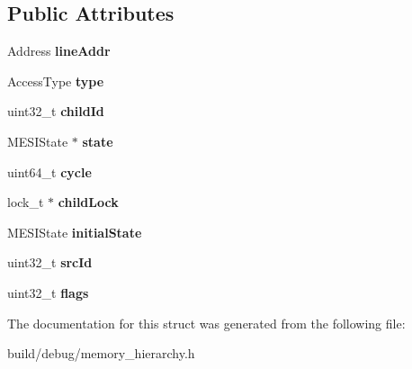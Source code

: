 \subsection*{Public Attributes}
\begin{DoxyCompactItemize}
\item 
\hypertarget{structMemReq_aff277d0b461a211c7317a5e6496797a7}{Address {\bfseries line\-Addr}}\label{structMemReq_aff277d0b461a211c7317a5e6496797a7}

\item 
\hypertarget{structMemReq_a8ad0f9d2d8e133320522e33e6456138a}{Access\-Type {\bfseries type}}\label{structMemReq_a8ad0f9d2d8e133320522e33e6456138a}

\item 
\hypertarget{structMemReq_a625f6e100f76719cb76671f9a0da5c75}{uint32\-\_\-t {\bfseries child\-Id}}\label{structMemReq_a625f6e100f76719cb76671f9a0da5c75}

\item 
\hypertarget{structMemReq_ad3e570609988405064d0e677901361c7}{M\-E\-S\-I\-State $\ast$ {\bfseries state}}\label{structMemReq_ad3e570609988405064d0e677901361c7}

\item 
\hypertarget{structMemReq_a11a5ceb04211f9e6a1584b0006ef0b53}{uint64\-\_\-t {\bfseries cycle}}\label{structMemReq_a11a5ceb04211f9e6a1584b0006ef0b53}

\item 
\hypertarget{structMemReq_ac5937ae766d938c48e66b06f6c6c4d43}{lock\-\_\-t $\ast$ {\bfseries child\-Lock}}\label{structMemReq_ac5937ae766d938c48e66b06f6c6c4d43}

\item 
\hypertarget{structMemReq_a346fbfd81deef9b3269aea15d76aa276}{M\-E\-S\-I\-State {\bfseries initial\-State}}\label{structMemReq_a346fbfd81deef9b3269aea15d76aa276}

\item 
\hypertarget{structMemReq_ab1c5db5372b47dd1e44c04e7c31e3adb}{uint32\-\_\-t {\bfseries src\-Id}}\label{structMemReq_ab1c5db5372b47dd1e44c04e7c31e3adb}

\item 
\hypertarget{structMemReq_a2f0374088b59f72c7a3e6ad78209a5e6}{uint32\-\_\-t {\bfseries flags}}\label{structMemReq_a2f0374088b59f72c7a3e6ad78209a5e6}

\end{DoxyCompactItemize}


The documentation for this struct was generated from the following file\-:\begin{DoxyCompactItemize}
\item 
build/debug/memory\-\_\-hierarchy.\-h\end{DoxyCompactItemize}
